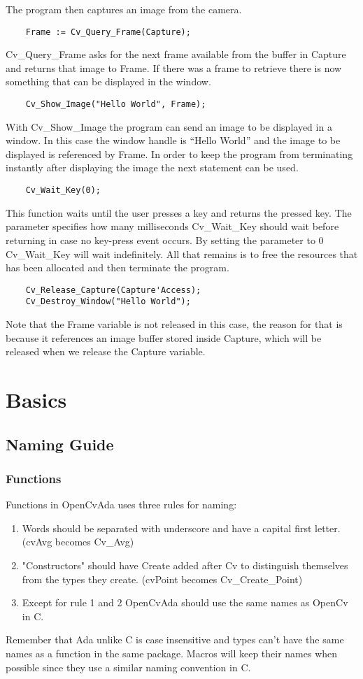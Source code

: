 The program then captures an image from the camera.
\begin{lstlisting}
	Frame := Cv_Query_Frame(Capture);
\end{lstlisting}
Cv_Query_Frame asks for the next frame available from the buffer in Capture and returns that image to Frame. If there was a frame to retrieve there is now something that can be displayed in the window.
\begin{lstlisting}
	Cv_Show_Image("Hello World", Frame);
\end{lstlisting}
With Cv_Show_Image the program can send an image to be displayed in a window. In this case the window handle is “Hello World” and the image to be displayed is referenced by Frame.
In order to keep the program from terminating instantly after displaying the image the next statement can be used.
\begin{lstlisting}
	Cv_Wait_Key(0);
\end{lstlisting}
This function waits until the user presses a key and returns the pressed key. The parameter specifies how many milliseconds Cv_Wait_Key should wait before returning in case no key-press event occurs. By setting the parameter to 0 Cv_Wait_Key will wait indefinitely.
All that remains is to free the resources that has been allocated and then terminate the program.
\begin{lstlisting}
	Cv_Release_Capture(Capture'Access);
	Cv_Destroy_Window("Hello World");
\end{lstlisting}
Note that the Frame variable is not released in this case, the reason for that is because it references an image buffer stored inside Capture, which will be released when we release the Capture variable.
\section{Basics }
\subsection{Naming Guide}
\subsubsection{Functions}
Functions in OpenCvAda uses three rules for naming:
\begin{enumerate}
\item Words should be separated with underscore and have a capital first letter. (cvAvg becomes Cv_Avg)
\item "Constructors" should have Create added after Cv to distinguish themselves from the types they create. (cvPoint becomes Cv_Create_Point)
\item Except for rule 1 and 2 OpenCvAda should use the same names as OpenCv in C.
\end{enumerate}
Remember that Ada unlike C is case insensitive and types can’t have the same names as a function in the same package.
Macros will keep their names when possible since they use a similar naming convention in C.
